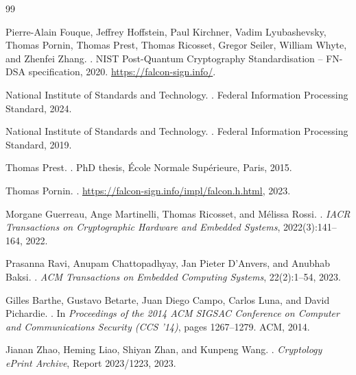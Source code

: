 \documentclass[sigconf,anonymous]{acmart}
\begin{document}
\begin{thebibliography}{99}

Pierre-Alain Fouque, Jeffrey Hoffstein, Paul Kirchner, Vadim Lyubashevsky,
  Thomas Pornin, Thomas Prest, Thomas Ricosset, Gregor Seiler, William
  Whyte, and Zhenfei Zhang.
.
\newblock NIST Post-Quantum Cryptography Standardisation -- FN-DSA
  specification, 2020.
\newblock \url{https://falcon-sign.info/}.

{National Institute of Standards and Technology}.
.
\newblock Federal Information Processing Standard, 2024.

{National Institute of Standards and Technology}.
.
\newblock Federal Information Processing Standard, 2019.

Thomas Prest.
.
\newblock PhD thesis, \'Ecole Normale Sup\'erieure, Paris, 2015.

Thomas Pornin.
.
\newblock \url{https://falcon-sign.info/impl/falcon.h.html}, 2023.

Morgane Guerreau, Ange Martinelli, Thomas Ricosset, and Mélissa Rossi.
.
\newblock \emph{IACR Transactions on Cryptographic Hardware and Embedded
  Systems}, 2022(3):141--164, 2022.

Prasanna Ravi, Anupam Chattopadhyay, Jan Pieter D'Anvers, and Anubhab Baksi.
.
\newblock \emph{ACM Transactions on Embedded Computing Systems},
  22(2):1--54, 2023.

Gilles Barthe, Gustavo Betarte, Juan Diego Campo, Carlos Luna, and David
  Pichardie.
.
\newblock In \emph{Proceedings of the 2014 ACM SIGSAC Conference on Computer
  and Communications Security (CCS '14)}, pages 1267--1279. ACM, 2014.

Jianan Zhao, Heming Liao, Shiyan Zhan, and Kunpeng Wang.
.
\newblock \emph{Cryptology ePrint Archive}, Report 2023/1223, 2023.


\end{thebibliography}
\end{document}
